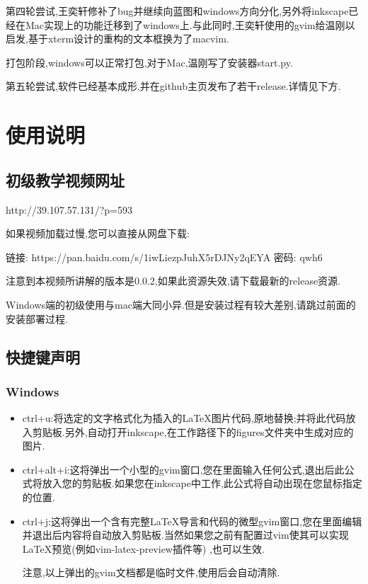 \documentclass[AutoFakeBold,letterpaper,12pt,hidelinks]{article}
\begin{document}
第四轮尝试,王奕轩修补了bug并继续向蓝图和windows方向分化,另外将inkscape已经在Mac实现上的功能迁移到了windows上.与此同时,王奕轩使用的gvim给温刚以启发,基于xterm设计的重构的文本框换为了macvim.

打包阶段,windows可以正常打包,对于Mac,温刚写了安装器start.py.

第五轮尝试,软件已经基本成形,并在github主页发布了若干release.详情见下方.

\section{使用说明}%

\subsection{初级教学视频网址}%

http://39.107.57.131/?p=593

如果视频加载过慢,您可以直接从网盘下载:

链接: https://pan.baidu.com/s/1iwLiezpJuhX5rDJNy2qEYA  密码: qwh6

注意到本视频所讲解的版本是0.0.2,如果此资源失效,请下载最新的release资源.

Windows端的初级使用与mac端大同小异.但是安装过程有较大差别,请跳过前面的安装部署过程.

\subsection{快捷键声明}%

\subsubsection{Windows}%

\begin{itemize}
	\item ctrl+u:将选定的文字格式化为插入的\LaTeX{}图片代码,原地替换;并将此代码放入剪贴板.另外,自动打开inkscape,在工作路径下的figures文件夹中生成对应的图片.

	\item  ctrl+alt+i:这将弹出一个小型的gvim窗口,您在里面输入任何公式,退出后此公式将放入您的剪贴板.如果您在inkscape中工作,此公式将自动出现在您鼠标指定的位置.

	\item  ctrl+j:这将弹出一个含有完整\LaTeX{}导言和代码的微型gvim窗口,您在里面编辑并退出后内容将自动放入剪贴板.当然如果您之前有配置过vim使其可以实现\LaTeX{}预览(例如vim-latex-preview插件等) ,也可以生效.

	注意,以上弹出的gvim文档都是临时文件,使用后会自动清除.

\end{itemize}
\end{document}
